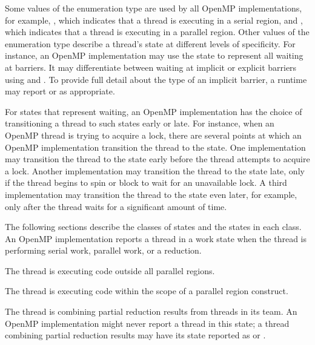 Some values of the enumeration type  are used by all
OpenMP implementations,
for example, ,
which indicates that a thread is executing in a serial region, and
,
which indicates that a thread is executing in a parallel region.
Other values of the enumeration type describe a thread's state at
different levels of specificity.
For instance, an OpenMP implementation may use
the state   to represent all
waiting at barriers. It may differentiate between waiting at implicit or explicit barriers using
 and .
To provide full detail about the type of an implicit barrier, a runtime may report
 or
 as appropriate.

For states that represent waiting, an OpenMP implementation has the
choice of transitioning a thread to such states early or late.
For instance, when an OpenMP thread is trying to acquire a lock,
there are several points at which an OpenMP implementation
transition the thread to the  state.
One implementation may transition the thread to the state
early before the thread attempts to acquire a
lock. Another implementation may transition the thread to the state
late, only if the thread begins to spin or
block to wait for an unavailable lock. A third implementation
may transition the thread to the state even later, for example, only
after the thread waits for a significant amount of time.

The following sections describe the classes of states and the states in each class.
An OpenMP implementation reports a thread in a work state
when the thread is performing serial work, parallel work, or a reduction.

\begin{description}

\item {}

  The thread is executing code outside all parallel regions.

\item {}

  The thread is executing code within the scope of a parallel region construct.

\sloppy
\item {}

  The thread is combining partial reduction results from threads in its team.
  An OpenMP implementation
  might never report a thread in this state; a thread
  combining partial reduction results may have its state reported as
   or .

\end{description}


